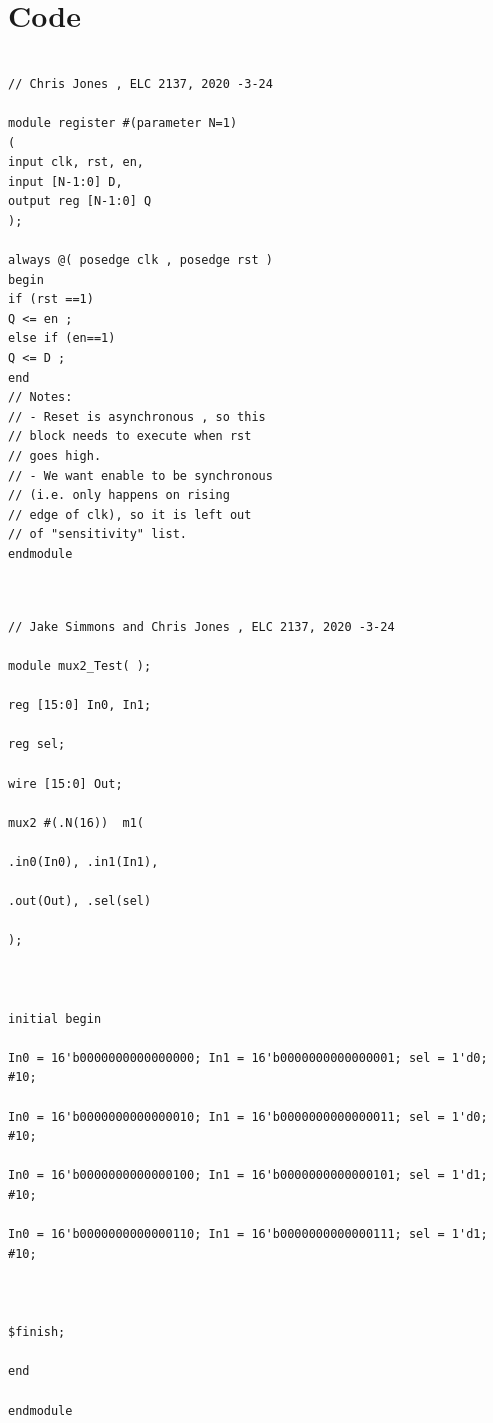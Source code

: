 \documentclass[11pt]{article}
\begin{document}
\section*{Code}

\begin{lstlisting}[style=Verilog,caption=Register Source File ,label=code:ex ]

// Chris Jones , ELC 2137, 2020 -3-24

module register #(parameter N=1) 
(
input clk, rst, en, 
input [N-1:0] D, 
output reg [N-1:0] Q
);

always @( posedge clk , posedge rst )
begin
if (rst ==1)
Q <= en ; 
else if (en==1) 
Q <= D ;
end
// Notes:  
// - Reset is asynchronous , so this 
// block needs to execute when rst 
// goes high. 
// - We want enable to be synchronous 
// (i.e. only happens on rising 
// edge of clk), so it is left out 
// of "sensitivity" list.
endmodule


\end{lstlisting}

\begin{lstlisting}[style=Verilog,caption=Mux 2 Test Bench Code ,label=code:ex ]

// Jake Simmons and Chris Jones , ELC 2137, 2020 -3-24

module mux2_Test( );

reg [15:0] In0, In1;

reg sel;

wire [15:0] Out;

mux2 #(.N(16))  m1(

.in0(In0), .in1(In1),

.out(Out), .sel(sel)

);



initial begin

In0 = 16'b0000000000000000; In1 = 16'b0000000000000001; sel = 1'd0; #10;

In0 = 16'b0000000000000010; In1 = 16'b0000000000000011; sel = 1'd0; #10;

In0 = 16'b0000000000000100; In1 = 16'b0000000000000101; sel = 1'd1; #10;

In0 = 16'b0000000000000110; In1 = 16'b0000000000000111; sel = 1'd1; #10;



$finish;

end

endmodule




\end{lstlisting}
\end{document}

